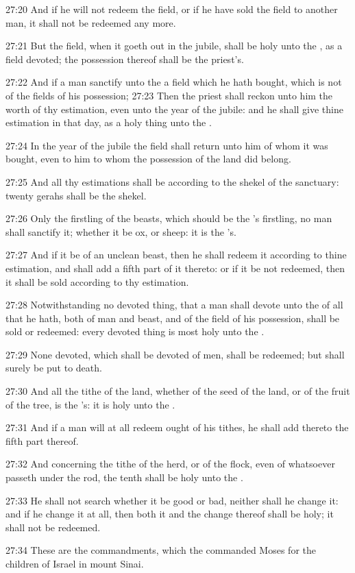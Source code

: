 27:20 And if he will not redeem the field, or if he have sold the
field to another man, it shall not be redeemed any more.

27:21 But the field, when it goeth out in the jubile, shall be holy
unto the \LORD, as a field devoted; the possession thereof shall be the
priest's.

27:22 And if a man sanctify unto the \LORD a field which he hath
bought, which is not of the fields of his possession; 27:23 Then the
priest shall reckon unto him the worth of thy estimation, even unto
the year of the jubile: and he shall give thine estimation in that
day, as a holy thing unto the \LORD.

27:24 In the year of the jubile the field shall return unto him of
whom it was bought, even to him to whom the possession of the land did
belong.

27:25 And all thy estimations shall be according to the shekel of the
sanctuary: twenty gerahs shall be the shekel.

27:26 Only the firstling of the beasts, which should be the \LORD's
firstling, no man shall sanctify it; whether it be ox, or sheep: it is
the \LORD's.

27:27 And if it be of an unclean beast, then he shall redeem it
according to thine estimation, and shall add a fifth part of it
thereto: or if it be not redeemed, then it shall be sold according to
thy estimation.

27:28 Notwithstanding no devoted thing, that a man shall devote unto
the \LORD of all that he hath, both of man and beast, and of the field
of his possession, shall be sold or redeemed: every devoted thing is
most holy unto the \LORD.

27:29 None devoted, which shall be devoted of men, shall be redeemed;
but shall surely be put to death.

27:30 And all the tithe of the land, whether of the seed of the land,
or of the fruit of the tree, is the \LORD's: it is holy unto the \LORD.

27:31 And if a man will at all redeem ought of his tithes, he shall
add thereto the fifth part thereof.

27:32 And concerning the tithe of the herd, or of the flock, even of
whatsoever passeth under the rod, the tenth shall be holy unto the
\LORD.

27:33 He shall not search whether it be good or bad, neither shall he
change it: and if he change it at all, then both it and the change
thereof shall be holy; it shall not be redeemed.

27:34 These are the commandments, which the \LORD commanded Moses for
the children of Israel in mount Sinai.

